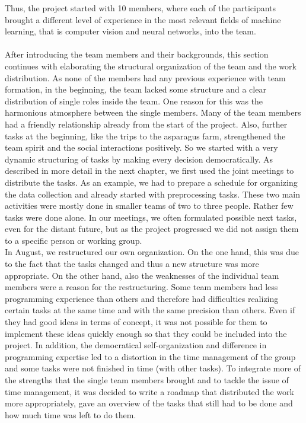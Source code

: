 Thus, the project started with 10 members, where each of the participants brought a different level of experience in the most relevant fields of machine learning, that is computer vision and neural networks, into the team.\\
\\
After introducing the team members and their backgrounds, this section continues with elaborating the structural organization of the team and the work distribution.
As none of the members had any previous experience with team formation, in the beginning, the team lacked some structure and a clear distribution of single roles inside the team. One reason for this was the harmonious atmosphere between the single members. Many of the team members had a friendly relationship already from the start of the project. Also, further tasks at the beginning, like the trips to the asparagus farm, strengthened the team spirit and the social interactions positively. So we started with a very dynamic structuring of tasks by making every decision democratically. As described in more detail in the next chapter, we first used the joint meetings to distribute the tasks. As an example, we had to prepare a schedule for organizing the data collection and already started with preprocessing tasks. These two main activities were mostly done in smaller teams of two to three people. Rather few tasks were done alone. In our meetings, we often formulated possible next tasks, even for the distant future, but as the project progressed we did not assign them to a specific person or working group. \\
In August, we restructured our own organization. On the one hand, this was due to the fact that the tasks changed and thus a new structure was more appropriate. On the other hand, also the weaknesses of the individual team members were a reason for the restructuring. Some team members had less programming experience than others and therefore had difficulties realizing certain tasks at the same time and with the same precision than others. Even if they had good ideas in terms of concept, it was not possible for them to implement these ideas quickly enough so that they could be included into the project. In addition, the democratical self-organization and difference in programming expertise led to a distortion in the time management of the group and some tasks were not finished in time (with other tasks). To integrate more of the strengths that the single team members brought and to tackle the issue of time management, it was decided to write a roadmap that distributed the work more appropriately, gave an overview of the tasks that still had to be done and how much time was left to do them.
